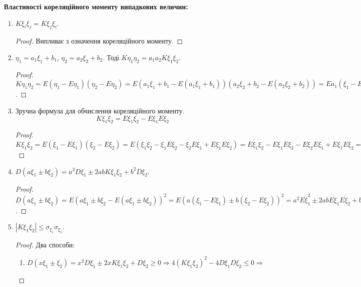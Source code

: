 \noindent \textbf{Властивості кореляційного моменту випадкових 
величин:}
\begin{enumerate}
    \item $K\xi_i\xi_j = K\xi_j\xi_i$.
    \begin{proof}
        Випливає з означення кореляційного моменту.
    \end{proof}
    \item $\eta_1 = a_1\xi_1 + b_1$, $\eta_2 = a_2\xi_2 + b_2$.
    Тоді $K\eta_1\eta_2 = a_1a_2K\xi_1\xi_2$.
    \begin{proof}
        $K\eta_1\eta_2 = E(\eta_1 - E\eta_1)(\eta_2 - E\eta_2) = 
        E(a_1\xi_1 + b_1 - E(a_1\xi_1 + b_1))
        (a_2\xi_2 + b_2 - E(a_2\xi_2 + b_2)) = 
        Ea_1(\xi_1 - E\xi_1)a_2(\xi_2 - E\xi_2) = 
        a_1a_2E(\xi_1 - E\xi_1)(\xi_2 - E\xi_2) = 
        a_1a_2K\xi_1\xi_2$.
    \end{proof}

    \item Зручна формула для обчислення кореляційного моменту.
    \begin{equation}
        K\xi_1\xi_2 = E\xi_1\xi_2 - E\xi_1 E\xi_2
    \end{equation}
    \begin{proof}
        $K\xi_1\xi_2 = E(\xi_1 - E\xi_1)(\xi_2 - E\xi_2) = 
        E(\xi_1\xi_2 - \xi_1E\xi_2 - \xi_2E\xi_1 + E\xi_1E\xi_2) = 
        E\xi_1\xi_2 - E\xi_1E\xi_2 - E\xi_2E\xi_1 + E\xi_1E\xi_2 = 
        E\xi_1\xi_2 - E\xi_1E\xi_2$
    \end{proof}
    
    \item $D(a\xi_1 \pm b\xi_2) = a^2D\xi_1 \pm 2abK\xi_1\xi_2 + 
    b^2D\xi_2$.

    \begin{proof}
        $D(a\xi_1 \pm b\xi_2) = 
        E(a\xi_1 \pm b\xi_2 - E(a\xi_1 \pm b\xi_2))^2 =
        E(a(\xi_1-E\xi_1)\pm b(\xi_2 - E\xi_2))^2 = 
        a^2 E\mathring{\xi}_1^2 \pm 2abE\mathring{\xi}_1 E\mathring{\xi} _2 
        + b^2 E\mathring{\xi}_2^2 = 
        a^2D\xi_1 \pm 2abK\xi_1\xi_2 + b^2D\xi_2$.
    \end{proof}

    \item $\left|K\xi_1\xi_2\right| \leq \sigma_{\xi_1} \sigma_{\xi_2}$.
    \begin{proof}
        Два способи: 
        \begin{enumerate}[label=\Roman*.]
            \item $D(x\xi_1 \pm \xi_2) = x^2 D\xi_1 \pm 2xK\xi_1\xi_2 + D\xi_2 \geq 0 
            \Rightarrow 4(K\xi_1\xi_2)^2 - 4D\xi_1D\xi_2 \leq 0 
            \Rightarrow $


\end{enumerate}
\end{proof}
\end{enumerate}
